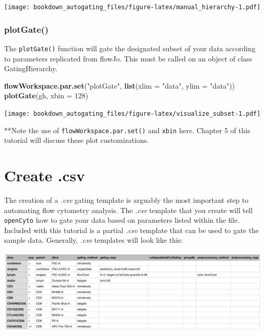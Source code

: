 \documentclass[]{book}
\newenvironment{Shaded}{\begin{snugshade}}{\end{snugshade}}
\newcommand{\DataTypeTok}[1]{\textcolor[rgb]{0.13,0.29,0.53}{#1}}
\newcommand{\DecValTok}[1]{\textcolor[rgb]{0.00,0.00,0.81}{#1}}
\newcommand{\KeywordTok}[1]{\textcolor[rgb]{0.13,0.29,0.53}{\textbf{#1}}}
\newcommand{\NormalTok}[1]{#1}
\newcommand{\StringTok}[1]{\textcolor[rgb]{0.31,0.60,0.02}{#1}}
\begin{document}
\texttt{[image: bookdown\_autogating\_files/figure-latex/manual\_hierarchy-1.pdf]}

\hypertarget{plotgate}{%
\subsection{plotGate()}\label{plotgate}}

The \texttt{plotGate()} function will gate the designated subset of your data according to parameters replicated from flowJo. This must be called on an object of class GatingHierarchy.

\begin{Shaded}
\begin{Highlighting}[]
\KeywordTok{flowWorkspace.par.set}\NormalTok{(}\StringTok{"plotGate"}\NormalTok{, }\KeywordTok{list}\NormalTok{(}\DataTypeTok{xlim =} \StringTok{"data"}\NormalTok{,}
                                       \DataTypeTok{ylim =} \StringTok{"data"}\NormalTok{))}
\KeywordTok{plotGate}\NormalTok{(gh, }\DataTypeTok{xbin =} \DecValTok{128}\NormalTok{)}
\end{Highlighting}
\end{Shaded}

\texttt{[image: bookdown\_autogating\_files/figure-latex/visualize\_subset-1.pdf]}

**Note the use of \texttt{flowWorkspace.par.set()} and \texttt{xbin} here. Chapter 5 of this tutorial will discuss these plot customizations.

\hypertarget{create-.csv}{%
\chapter{Create .csv}\label{create-.csv}}

The creation of a \emph{.csv} gating template is arguably the most important step to automating flow cytometry analysis. The \emph{.csv} template that you create will tell \texttt{openCyto} how to gate your data based on parameters listed within the file. Included with this tutorial is a partial \emph{.csv} template that can be used to gate the sample data. Generally, \emph{.csv} templates will look like this:

\includegraphics[width=0.6\linewidth]{../tutorial/images/entire_csv}
\end{document}
